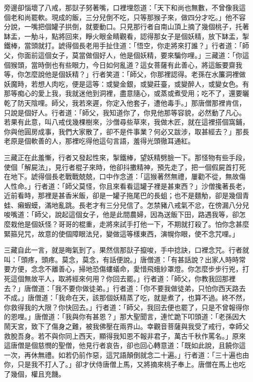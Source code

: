旁邊卻惱壞了八戒，那獃子努著嘴，口裡埋怨道：「天下和尚也無數，不曾像我這個老和尚罷軟。現成的飯，三分兒倒不吃，只等那猴子來，做四分才吃。」他不容分說，一嘴把個罐子拱倒，就要動口。只見那行者自南山頂上摘了幾個桃子，托著缽盂，一觔斗，點將回來，睜火眼金睛觀看，認得那女子是個妖精，放下缽盂，掣鐵棒，當頭就打。諕得個長老用手扯住道：「悟空，你走將來打誰？」行者道：「師父，你面前這個女子，莫當做個好人，他是個妖精，要來騙你哩。」三藏道：「你這個猴頭，當時倒也有些眼力，今日如何亂道？這女菩薩有此善心，將這飯要齋我等，你怎麼說他是個妖精？」行者笑道：「師父，你那裡認得。老孫在水簾洞裡做妖魔時，若想人肉吃，便是這等：或變金銀，或變莊臺，或變醉人，或變女色。有那等痴心的愛上我，我就迷他到洞裡，盡意隨心，或蒸或煮受用；吃不了，還要曬乾了防天陰哩。師父，我若來遲，你定入他套子，遭他毒手。」那唐僧那裡肯信，只說是個好人。行者道：「師父，我知道你了，你見他那等容貌，必然動了凡心。若果有此意，叫八戒伐幾棵樹來，沙僧尋些草來，我做木匠，就在這裡搭個窩鋪，你與他圓房成事，我們大家散了，卻不是件事業？何必又跋涉，取甚經去？」那長老原是個軟善的人，那裡吃得他這句言語，羞得光頭徹耳通紅。

三藏正在此羞慚，行者又發起性來，掣鐵棒，望妖精劈臉一下。那怪物有些手段，使個「解屍法」，見行者棍子來時，他卻抖擻精神，預先走了，把一個假屍首打死在地下。諕得個長老戰戰兢兢，口中作念道：「這猴著然無禮，屢勸不從，無故傷人性命。」行者道：「師父莫怪，你且來看看這罐子裡是甚東西？」沙僧攙著長老，近前看時，那裡是甚香米飯，卻是一罐子拖尾巴的長蛆；也不是麵觔，卻是幾個青蛙、癩蝦蟆，滿地亂跳。長老才有三分兒信了。怎禁豬八戒氣不忿，在傍漏八分兒唆嘴道：「師父，說起這個女子，他是此間農婦，因為送飯下田，路遇我等，卻怎麼栽他是個妖怪？哥哥的棍重，走將來試手打他一下，不期就打殺了。怕你念甚麼緊箍兒咒，故意的使個障眼法兒，變做這等樣東西，演幌你眼，使不念咒哩。」

三藏自此一言，就是晦氣到了。果然信那獃子攛唆，手中捻訣，口裡念咒。行者就叫：「頭疼，頭疼。莫念，莫念，有話便說。」唐僧道：「有甚話說？出家人時時常要方便，念念不離善心，掃地恐傷螻蟻命，愛惜飛蛾紗罩燈。你怎麼步步行兇，打死這個無故平人，取將經來何用？你回去罷。」行者道：「師父，你教我回那裡去？」唐僧道：「我不要你做徒弟。」行者道：「你不要我做徒弟，只怕你西天路去不成。」唐僧道：「我命在天，該那個妖精蒸了吃，就是煮了，也算不過。終不然，你救得我的大限？你快回去。」行者道：「師父，我回去便也罷了，只是不曾報得你的恩哩。」唐僧道：「我與你有甚恩？」那大聖聞言，連忙跪下叩頭道：「老孫因大鬧天宮，致下了傷身之難，被我佛壓在兩界山。幸觀音菩薩與我受了戒行，幸師父救脫吾身。若不與你同上西天，顯得我知恩不報非君子，萬古千秋作罵名。」原來這唐僧是個慈憫的聖僧，他見行者哀告，卻也回心轉意道：「既如此說，且饒你這一次，再休無禮。如若仍前作惡，這咒語顛倒就念二十遍。」行者道：「三十遍也由你，只是我不打人了。」卻才伏侍唐僧上馬，又將摘來桃子奉上。唐僧在馬上也吃了幾個，權且充饑。

